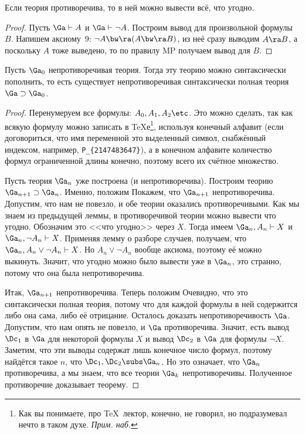 \documentclass[a4paper,draft]{article}
\begin{document}
\begin{lemma}
  Если теория противоречива, то в ней можно вывести всё, что угодно.
\end{lemma}
\begin{proof}
  Пусть $\Ga \vdash A$ и $\Ga \vdash \neg A$. Построим вывод для произвольной формулы $B$.
  Напишем аксиому~9: $\neg A \bw\ra (A \bw\ra B)$, из неё сразу выводим $A \ra B$, а поскольку $A$ тоже
  выведено, то по правилу MP получаем вывод для $B$.
\end{proof}

\begin{lemma}
  Пусть $\Ga_0$ непротиворечивая теория. Тогда эту теорию можно синтаксически пополнить,
  то есть существует непротиворечивая синтаксически полная теория $\Ga \supset \Ga_0$.
\end{lemma}
\begin{proof}
  Перенумеруем все формулы: $A_0, A_1,A_2\etc$. Это можно сделать, так как всякую формулу можно записать
  в \TeX е\footnote{Как вы понимаете, про \TeX\ лектор, конечно, не говорил, но подразумевал нечто в таком духе. \emph{Прим. наб.}},
  используя конечный алфавит (если договориться, что имя переменной это выделенный символ,
  снабжённый индексом, например, \verb'P_{2147483647}'), а в конечном алфавите количество формул ограниченной длины конечно,
  поэтому всего их счётное множество.

  Пусть теория $\Ga_n$ уже построена (и непротиворечива). Построим теорию $\Ga_{n+1} \supset \Ga_n$. Именно, положим
  Покажем, что $\Ga_{n+1}$ непротиворечива.
  Допустим, что нам не повезло, и обе теории оказались противоречивыми. Как мы знаем из предыдущей леммы,
  в противоречивой теории можно вывести что угодно. Обозначим это <<что угодно>> через $X$.
  Тогда имеем $\Ga_n, A_n \vdash X$ и $\Ga_n, \neg A_n \vdash X$. Применяя лемму о разборе случаев,
  получаем, что $\Ga_n, A_n \vee \neg A_n \vdash X$. Но $A_n \vee \neg A_n$ вообще аксиома, поэтому
  её можно выкинуть. Значит, что угодно можно было вывести уже в $\Ga_n$, это странно, потому что она была
  непротиворечива.

  Итак, $\Ga_{n+1}$ непротиворечива. Теперь положим
  Очевидно, что это синтаксически
  полная теория, потому что для каждой формулы в ней содержится либо она сама, либо её отрицание.
  Осталось доказать непротиворечивость $\Ga$. Допустим, что нам опять не повезло, и $\Ga$ противоречива.
  Значит, есть вывод $\Dc_1$ в $\Ga$ для некоторой формулы $X$ и вывод $\Dc_2$ в $\Ga$ для формулы $\neg X$.
  Заметим, что эти выводы содержат лишь конечное число формул, поэтому найдётся такое $n$, что $\Dc_1, \Dc_2 \subs \Ga_n$.
  Но это означает, что $\Ga_n$ противоречива, а мы знаем, что все теории $\Ga_k$ непротиворечивы. Полученное противоречие
  доказывает теорему.
\end{proof}
\end{document}

